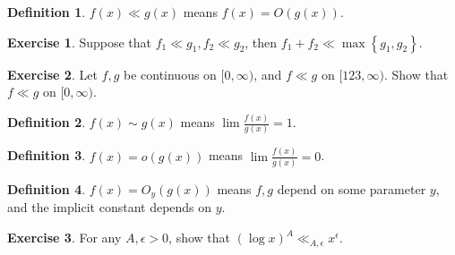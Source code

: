 \documentclass[11pt]{article}
\theoremstyle{definition}
\newtheorem{defn}{Definition}[section]
\newtheorem{exe}{Exercise}[section]
\newcommand{\set}[1]{\left\{ #1 \right\}}
\begin{document}
\begin{defn}
$f(x)\ll g(x)$ means $f(x)=O(g(x))$.
\end{defn}

\begin{exe}
Suppose that $f_1\ll g_1, f_2\ll g_2$, then $f_1+f_2\ll\max\set{g_1,g_2}$. \checkmark
\end{exe}

\begin{exe}
Let $f,g$ be continuous on $[0,\infty)$, and $f\ll g$ on $[123,\infty)$. Show that $f\ll g$
on $[0,\infty)$. \checkmark
\end{exe}

\begin{defn}
$f(x)\sim g(x)$ means $\lim\frac{f(x)}{g(x)}=1$.
\end{defn}

\begin{defn}
$f(x)=o(g(x))$ means $\lim\frac{f(x)}{g(x)}=0$.
\end{defn}

\begin{defn}
$f(x)=O_y(g(x))$ means $f,g$ depend on some parameter $y$, and the implicit constant
depends on $y$.
\end{defn}

\begin{exe}
For any $A,\epsilon>0$, show that $(\log x)^A \ll_{A,\epsilon} x^\epsilon$.
\end{exe}











\end{document}
